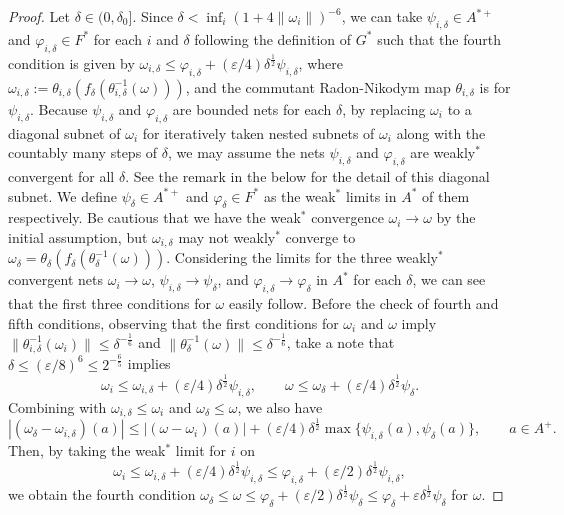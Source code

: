 \documentclass[noamsfonts,a4paper,10pt]{amsart}
\theoremstyle{plain}
\theoremstyle{definition}
\theoremstyle{remark}
\begin{document}
\begin{proof}
Let $\delta\in(0,\delta_0]$.
Since $\delta<\inf_i(1+4\|\omega_i\|)^{-6}$, we can take $\psi_{i,\delta}\in A^{*+}$ and $\varphi_{i,\delta}\in F^*$ for each $i$ and $\delta$ following the definition of $G^*$ such that the fourth condition is given by $\omega_{i,\delta}\le\varphi_{i,\delta}+(\varepsilon/4)\delta^{\frac12}\psi_{i,\delta}$, where $\omega_{i,\delta}:=\theta_{i,\delta}(f_\delta(\theta_{i,\delta}^{-1}(\omega)))$, and the commutant Radon-Nikodym map $\theta_{i,\delta}$ is for $\psi_{i,\delta}$.
Because $\psi_{i,\delta}$ and $\varphi_{i,\delta}$ are bounded nets for each $\delta$, by replacing $\omega_i$ to a diagonal subnet of $\omega_i$ for iteratively taken nested subnets of $\omega_i$ along with the countably many steps of $\delta$, we may assume the nets $\psi_{i,\delta}$ and $\varphi_{i,\delta}$ are weakly$^*$ convergent for all $\delta$.
See the remark in the below for the detail of this diagonal subnet.
We define $\psi_\delta\in A^{*+}$ and $\varphi_\delta\in F^*$ as the weak$^*$ limits in $A^*$ of them respectively.
Be cautious that we have the weak$^*$ convergence $\omega_i\to\omega$ by the initial assumption, but $\omega_{i,\delta}$ may not weakly$^*$ converge to $\omega_\delta=\theta_\delta(f_\delta(\theta_\delta^{-1}(\omega)))$.
Considering the limits for the three weakly$^*$ convergent nets $\omega_i\to\omega$, $\psi_{i,\delta}\to\psi_\delta$, and $\varphi_{i,\delta}\to\varphi_\delta$ in $A^*$ for each $\delta$, we can see that the first three conditions for $\omega$ easily follow.
Before the check of fourth and fifth conditions, observing that the first conditions for $\omega_i$ and $\omega$ imply $\|\theta_{i,\delta}^{-1}(\omega_i)\|\le\delta^{-\frac16}$ and $\|\theta_\delta^{-1}(\omega)\|\le\delta^{-\frac16}$, take a note that $\delta\le(\varepsilon/8)^6\le2^{-\frac65}$ implies
\[\omega_i\le\omega_{i,\delta}+(\varepsilon/4)\delta^{\frac12}\psi_{i,\delta},\qquad\omega\le\omega_\delta+(\varepsilon/4)\delta^{\frac12}\psi_\delta.\]
Combining with $\omega_{i,\delta}\le\omega_i$ and $\omega_\delta\le\omega$, we also have
\[|(\omega_\delta-\omega_{i,\delta})(a)|\le|(\omega-\omega_i)(a)|+(\varepsilon/4)\delta^{\frac12}\max\{\psi_{i,\delta}(a),\psi_\delta(a)\},\qquad a\in A^+.\]
Then, by taking the weak$^*$ limit for $i$ on
\[\omega_i\le\omega_{i,\delta}+(\varepsilon/4)\delta^{\frac12}\psi_{i,\delta}\le\varphi_{i,\delta}+(\varepsilon/2)\delta^{\frac12}\psi_{i,\delta},\]
we obtain the fourth condition $\omega_\delta\le\omega\le\varphi_\delta+(\varepsilon/2)\delta^{\frac12}\psi_\delta\le\varphi_\delta+\varepsilon\delta^{\frac12}\psi_\delta$ for $\omega$.

\end{proof}
\end{document}
